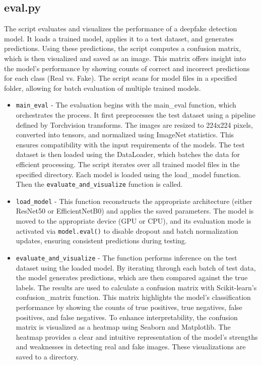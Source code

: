 \documentclass[conference]{IEEEtran}
\begin{document}
    \subsection*{eval.py} 
    The script evaluates and visualizes the performance of a deepfake detection model. It loads a trained model, applies it to a test dataset, and generates predictions. Using these predictions, the script computes a confusion matrix, which is then visualized and saved as an image. This matrix offers insight into the model’s performance by showing counts of correct and incorrect predictions for each class (Real vs. Fake). The script scans for model files in a specified folder, allowing for batch evaluation of multiple trained models.
    \begin{itemize}
        \item \texttt{main\_eval} - The evaluation begins with the main\_eval function, which orchestrates the process. It first preprocesses the test dataset using a pipeline defined by Torchvision transforms. The images are resized to 224x224 pixels, converted into tensors, and normalized using ImageNet statistics. This ensures compatibility with the input requirements of the models. The test dataset is then loaded using the DataLoader, which batches the data for efficient processing. The script iterates over all trained model files in the specified directory. Each model is loaded using the load\_model function. Then the \texttt{evaluate\_and\_visualize} function is called. \\
        \item \texttt{load\_model} - This function reconstructs the appropriate architecture (either ResNet50 or EfficientNetB0) and applies the saved parameters. The model is moved to the appropriate device (GPU or CPU), and its evaluation mode is activated via \texttt{model.eval()} to disable dropout and batch normalization updates, ensuring consistent predictions during testing. \\
        \item \texttt{evaluate\_and\_visualize} - The function performs inference on the test dataset using the loaded model. By iterating through each batch of test data, the model generates predictions, which are then compared against the true labels. The results are used to calculate a confusion matrix with Scikit-learn’s confusion\_matrix function. This matrix highlights the model's classification performance by showing the counts of true positives, true negatives, false positives, and false negatives. To enhance interpretability, the confusion matrix is visualized as a heatmap using Seaborn and Matplotlib. The heatmap provides a clear and intuitive representation of the model's strengths and weaknesses in detecting real and fake images. These visualizations are saved to a directory.
        
    \end{itemize}
\end{document}
